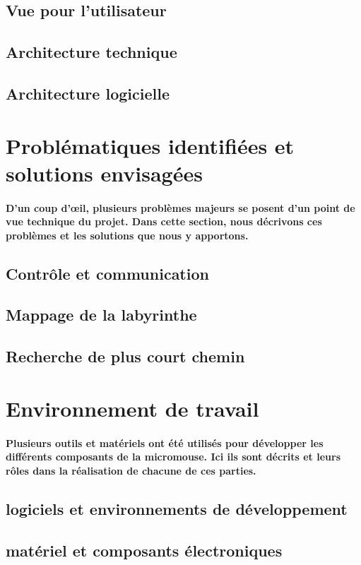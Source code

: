 \subsection{Vue pour l’utilisateur} \label{subsec:vueUtil}

\subsection{Architecture technique} \label{subsec:archTechnique}

\subsection{Architecture logicielle} \label{subsec:vueLogicielle}

\section{Problématiques identifiées et solutions envisagées} \label{sec:problemesSolutions}
\paragraph{D'un coup d'œil, plusieurs problèmes majeurs se posent d'un point de vue technique du projet.
Dans cette section, nous décrivons ces problèmes et les solutions que nous y apportons.
}

\subsection{Contrôle et communication}

\subsection{Mappage de la labyrinthe}

\subsection{Recherche de plus court chemin}

\section{Environnement de travail} \label{sec:environnement}

\paragraph{
Plusieurs outils et matériels ont été utilisés pour développer les différents composants
de la micromouse. Ici ils sont décrits et leurs rôles dans la réalisation de chacune de ces parties.
}

\subsection{logiciels et environnements de développement}

\subsection{matériel et composants électroniques}